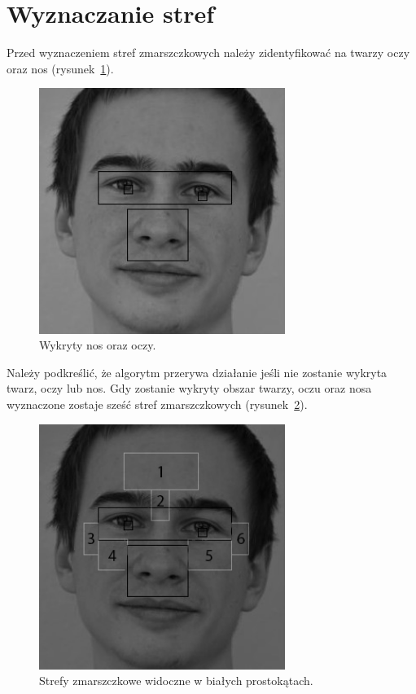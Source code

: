 \documentclass[a4paper,twoside,12pt]{book}
\begin{document}
    \section{Wyznaczanie stref}\label{sec:wyznaczanieStref}
    Przed wyznaczeniem stref zmarszczkowych należy zidentyfikować na twarzy oczy oraz nos
    (rysunek~\ref{fig.wykrywanieOczuNosa}).
    \begin{figure}
        \centering
        \includegraphics[width=8cm]{Obrazy/wykrywanieOczuNosa.jpg}
        \caption{Wykryty nos oraz oczy.}
        \label{fig.wykrywanieOczuNosa}
    \end{figure}
    Należy podkreślić, że algorytm przerywa działanie jeśli nie zostanie wykryta twarz, oczy lub nos.
    Gdy zostanie wykryty obszar twarzy, oczu oraz nosa wyznaczone zostaje sześć stref zmarszczkowych
    (rysunek~\ref{fig.wykrywanieStrefZmarszczkowych}).

    \begin{figure}
        \centering
        \includegraphics[width=8cm]{Obrazy/strefyZmarszczkowe.jpg}
        \caption{Strefy zmarszczkowe widoczne w białych prostokątach.}
        \label{fig.wykrywanieStrefZmarszczkowych}
    \end{figure}
\end{document}
